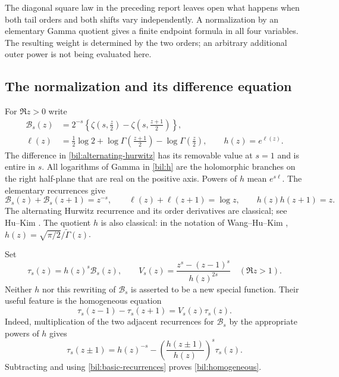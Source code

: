 \documentclass[11pt]{article}
\theoremstyle{definition}
\theoremstyle{remark}
\numberwithin{equation}{section}
\begin{document}
The diagonal square law in the preceding report leaves open what happens
when both tail orders and both shifts vary independently. A normalization
by an elementary Gamma quotient gives a finite endpoint formula in all
four variables. The resulting weight is determined by the two orders;
an arbitrary additional outer power is not being evaluated here.

\subsection{The normalization and its difference equation}

For $\Re z>0$ write
\begin{align}
 \mathcal B_s(z)
 &=2^{-s}\left\{\zeta\left(s,\frac z2\right)
                    -\zeta\left(s,\frac{z+1}{2}\right)\right\},
                    \label{bil:alternating-hurwitz}\\
 \ell(z)&=\frac12\log2+\log\Gamma\left(\frac{z+1}{2}\right)
                     -\log\Gamma\left(\frac z2\right),\qquad
 h(z)=e^{\ell(z)}.\label{bil:h}
\end{align}
The difference in \eqref{bil:alternating-hurwitz} has its removable
value at $s=1$ and is entire in $s$. All logarithms of Gamma in
\eqref{bil:h} are the holomorphic branches on the right half-plane that
are real on the positive axis. Powers of $h$ mean $e^{s\ell}$.
The elementary recurrences give
\begin{equation}\label{bil:basic-recurrences}
 \mathcal B_s(z)+\mathcal B_s(z+1)=z^{-s},\qquad
 \ell(z)+\ell(z+1)=\log z,\qquad h(z)h(z+1)=z.
\end{equation}
The alternating Hurwitz recurrence and its order derivatives are
classical; see Hu--Kim \cite{bil:HuKim}. The quotient $h$ is also
classical: in the notation of Wang--Hu--Kim \cite{bil:WangHuKim},
$h(z)=\sqrt{\pi/2}/\widetilde\Gamma(z)$.

Set
\begin{equation}\label{bil:tau-v}
 \tau_s(z)=h(z)^s\mathcal B_s(z),\qquad
 V_s(z)=\frac{z^s-(z-1)^s}{h(z)^{2s}}\quad(\Re z>1).
\end{equation}
Neither $h$ nor this rewriting of $\mathcal B_s$ is asserted to be a
new special function. Their useful feature is the homogeneous equation
\begin{equation}\label{bil:homogeneous}
 \boxed{\tau_s(z-1)-\tau_s(z+1)=V_s(z)\tau_s(z).}
\end{equation}
Indeed, multiplication of the two adjacent recurrences for
$\mathcal B_s$ by the appropriate powers of $h$ gives
\[
 \tau_s(z\pm1)=h(z)^{-s}
                  -\left(\frac{h(z\pm1)}{h(z)}\right)^s\tau_s(z).
\]
Subtracting and using \eqref{bil:basic-recurrences} proves
\eqref{bil:homogeneous}.
\end{document}
